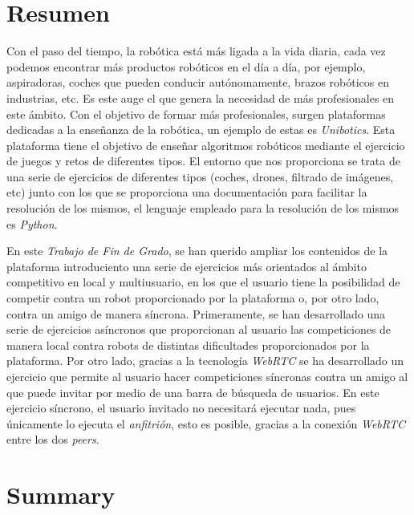 \documentclass[a4paper, 12pt]{book}
\begin{document}

\chapter*{Resumen}


Con el paso del tiempo, la robótica está más ligada a la vida diaria, cada vez podemos encontrar más productos robóticos en el día a día, por ejemplo, aspiradoras, coches que pueden conducir autónomamente, brazos robóticos en industrias, etc. Es este auge el que genera la necesidad de más profesionales en este ámbito. Con el objetivo de formar más profesionales, surgen plataformas dedicadas a la enseñanza de la robótica, un ejemplo de estas es \emph{Unibotics}. Esta plataforma tiene el objetivo de enseñar algoritmos robóticos mediante el ejercicio de juegos y retos de diferentes tipos. El entorno que nos proporciona se trata de una serie de ejercicios de diferentes tipos (coches, drones, filtrado de imágenes, etc) junto con los que se proporciona una documentación para facilitar la resolución de los mismos, el lenguaje empleado para la resolución de los mismos es \emph{Python}.

En este \emph{Trabajo de Fin de Grado}, se han querido ampliar los contenidos de la plataforma introduciento una serie de ejercicios más orientados al ámbito competitivo en local y multiusuario, en los que el usuario tiene la posibilidad de competir contra un robot proporcionado por la plataforma o, por otro lado, contra un amigo de manera síncrona. Primeramente, se han desarrollado una serie de ejercicios asíncronos que proporcionan al usuario las competiciones de manera local contra robots de distintas dificultades proporcionados por la plataforma. Por otro lado, gracias a la tecnología \emph{WebRTC} se ha desarrollado un ejercicio que permite al usuario hacer competiciones síncronas contra un amigo al que puede invitar por medio de una barra de búsqueda de usuarios. En este  ejercicio síncrono, el usuario invitado no necesitará ejecutar nada, pues únicamente lo ejecuta el \emph{anfitrión}, esto es posible, gracias a la conexión \emph{WebRTC} entre los dos \emph{peers}.


\chapter*{Summary}
\end{document}
